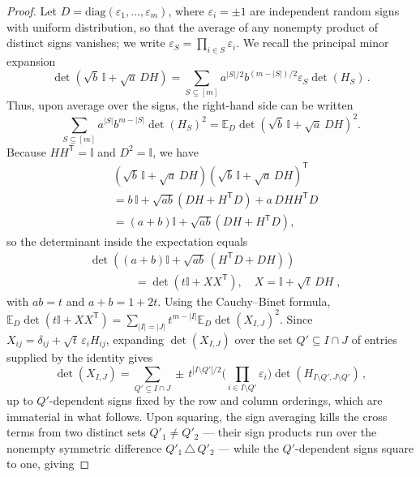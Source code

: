 \documentclass[prx,twocolumn,superscriptaddress,aps,10pt, frontmatterverbose, reprint,footinbib,longbibliography=true]{revtex4-2}
\newcommand{\trans}{\mathsf{T}}
\begin{document}
\begin{proof}
Let $D=\mathrm{diag}(\varepsilon_1,\dots,\varepsilon_m)$, where $\varepsilon_i=\pm1$ are independent random signs with uniform distribution, so that the average of any nonempty product of distinct signs vanishes; we write $\varepsilon_S=\prod_{i\in S}\varepsilon_i$.
We recall the principal minor expansion
\begin{equation}
    \det\!\left(\sqrt b\,\mathbb{I}+\sqrt a\,DH\right)= \sum_{S\subseteq[m]}a^{|S|/2}b^{(m-|S|)/2} \varepsilon_S \det(H_S)\,.
\end{equation}
Thus, upon average over the signs, the right-hand side can be written
\begin{equation}
    \sum_{S\subseteq[m]}a^{|S|}b^{m-|S|}\det(H_S)^2=\mathbb{E}_D\det\!\left(\sqrt b\,\mathbb{I}+\sqrt a\,DH\right)^2 .
\end{equation}
Because $HH^{\trans}=\mathbb{I}$ and $D^2=\mathbb{I}$, we have
\begin{equation}
    \begin{split}
      &\left(\sqrt b\,\mathbb{I}+\sqrt a\,DH\right)   \left(\sqrt b\,\mathbb{I}+\sqrt a\,DH\right)^\trans\\
&=
b\,\mathbb{I}
+\sqrt{ab}\left(DH+H^{\trans}D\right)
+a\,DHH^{\trans}D \\
&=
(a+b)\mathbb{I}
+\sqrt{ab}\left(DH+H^{\trans}D\right),
    \end{split}
\end{equation}
so the determinant inside the expectation equals
\begin{equation}
\begin{split}
    &\det\!\left((a+b)\mathbb{I}+\sqrt{ab}\,(H^{\trans}D+DH)\right)\\
    &\qquad\qquad=\det\!\left(t\mathbb{I}+XX^{\trans}\right),\quad X=\mathbb{I}+\sqrt t\,DH\;,
\end{split}
\end{equation}
with $ab=t$ and $a+b=1+2t$.
Using the Cauchy--Binet formula, $\mathbb{E}_D\det(t\mathbb{I}+XX^{\trans})=\sum_{|I|=|J|}t^{m-|I|}\mathbb{E}_D\det(X_{I,J})^2$. Since $X_{ij}=\delta_{ij}+ \sqrt{t}\, \varepsilon_i H_{ij}$, expanding $\det(X_{I,J})$ over the set $Q'\subseteq I\cap J$ of entries supplied by the identity gives
\begin{equation}
    \det(X_{I,J})= \sum_{Q' \subseteq I \cap J} \pm\,t^{|I \setminus Q'|/2} \big(\prod_{i\in I\setminus Q'}\varepsilon_i\big)\det(H_{I\setminus Q',J\setminus Q'})\,,
\end{equation} 
up to $Q'$-dependent signs fixed by the row and column orderings, which are immaterial in what follows. Upon squaring, the sign  averaging kills the cross terms from two distinct sets $Q'_1\neq Q'_2$ --- their sign products run over the nonempty symmetric difference $Q'_1\,\triangle\,Q'_2$ --- while the $Q'$-dependent signs square to one, giving

\end{proof}
\end{document}
